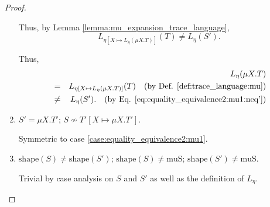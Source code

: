 \documentclass{llncs}
\newcommand*{\shape}{\mathrm{shape}}
\newcommand*{\muS}{\mathrm{muS}}
\newcommand*{\nsequiv}{\not\sim}
\renewcommand*{\|}{\;|\;}
\begin{document}
\begin{proof}
\begin{enumerate}
      Thus, by Lemma \ref{lemma:mu_expansion_trace_language},
      \begin{equation}
        \label{eq:equality_equivalence2:mu1:neq'}
        L_{\eta[X \mapsto L_\eta(\mu X.T)]}(T) \neq L_\eta(S').
      \end{equation}

      Thus,
      \begin{eqnarray*}
        &&     L_\eta(\mu X.T) \\
        &=&    L_{\eta[X \mapsto L_\eta(\mu X.T)]}(T)
               \quad \text{(by Def. \ref{def:trace_language:mu})} \\
        &\neq& L_\eta(S').
               \quad \text{(by Eq. \ref{eq:equality_equivalence2:mu1:neq'})}
      \end{eqnarray*}

    \item
      \label{case:equality_equivalence2:mu2}
      $S' = \mu X.T'$; $S \nsequiv T'[X \mapsto \mu X.T']$.

      Symmetric to case \ref{case:equality_equivalence2:mu1}.

    \item
      \label{case:equality_equivalence2:shape}
      $\shape(S) \neq \shape(S')$; $\shape(S) \neq \muS$; $\shape(S') \neq \muS$.

      Trivial by case analysis on $S$ and $S'$ as well as the definition
      of $L_\eta$.
  \end{enumerate}
\end{proof}
\end{document}
